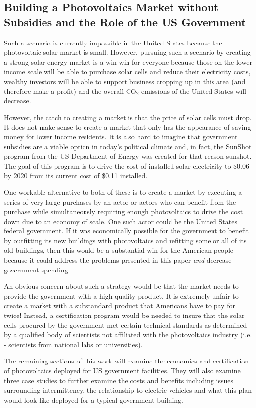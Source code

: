 \subsection{Building a Photovoltaics Market without Subsidies and the Role of 
the US Government}

Such a scenario is currently impossible in the United States because the 
photovoltaic solar market is small. However, pursuing such a scenario by 
creating a strong solar energy market is a win-win for everyone because those
on the lower income scale will be able to purchase solar cells and reduce 
their electricity costs, wealthy investors will be able to support business 
cropping up in this area (and therefore make a profit) and the overall CO$_2$ 
emissions of the United States will decrease.

However, the catch to creating a market is that the price of solar cells must 
drop. It does not make sense to create a market that only has the appearance 
of saving money for lower income residents. It is also hard to imagine that 
government subsidies are a viable option in today’s political climate and, in 
fact, the SunShot program from the US Department of Energy was created for that 
reason \cite{jay}{sunshot}. The goal of this program is to drive the cost of 
installed solar electricity to \$0.06 by 2020 from its current cost of \$0.11 
installed.

One workable alternative to both of these is to create a market by executing a 
series of very large purchases by an actor or actors who can benefit from the 
purchase while simultaneously requiring enough photovoltaics to drive the cost 
down due to an economy of scale. One such actor could be the United States 
federal government. If it was economically possible for the government to 
benefit by outfitting its new buildings with photovoltaics and refitting some 
or all of its old buildings, then this would be a substantial win for the 
American people because it could address the problems presented in this paper 
\textit{and} decrease government spending. 

An obvious concern about such a strategy would be that the market needs to 
provide the government with a high quality product. It is extremely unfair to 
create a market with a substandard product that Americans have to pay for 
twice! Instead, a certification program would be needed to insure that the 
solar cells procured by the government met certain technical standards as 
determined by a qualified body of scientists not affiliated with the 
photovoltaics industry (i.e. - scientists from national labs or universities).

The remaining sections of this work will examine the economics and 
certification of photovoltaics deployed for US government facilities. They will
also examine three case studies to further examine the costs and benefits 
including issues surrounding intermittency, the relationship to electric 
vehicles and what this plan would look like deployed for a typical government 
building.
